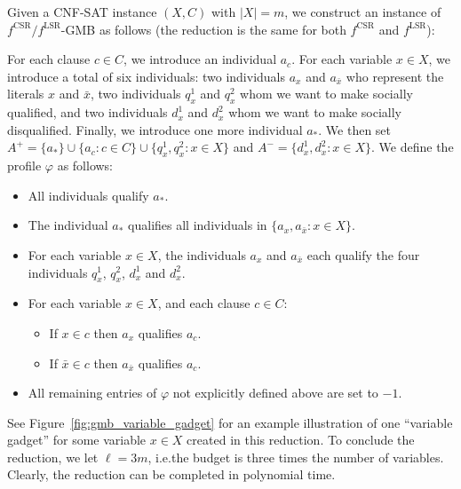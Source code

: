 \documentclass[
    12pt,               %
    a4paper,            %
    bibtotoc,           %
    pointlessnumbers,   %
    ngerman,            %
    titlepage,          %
    leqno,              %
    ]{scrarticle}       %
\newcommand\figref{Figure~\ref}
\begin{document}
\begin{Proof}
Given a CNF-SAT instance $(X, C)$ with $|X|=m$, we construct an instance of $f^{\text{CSR}} / f^{\text{LSR}}$-GMB as follows (the reduction is the same for both $f^{\text{CSR}}$ and $f^{\text{LSR}}$):

For each clause $c \in C$, we introduce an individual $a_c$. For each variable $x \in X$, we introduce a total of six individuals: two individuals $a_x$ and $a_{\bar{x}}$ who represent the literals $x$ and $\bar{x}$, two individuals $q_x^1$ and $q_x^2$ whom we want to make socially qualified, and two individuals $d_x^1$ and $d_x^2$ whom we want to make socially disqualified. Finally, we introduce one more individual $a_\ast$. We then set $A^+ = \{a_\ast\} \cup \{ a_c : c \in C \} \cup \{ q_x^1, q_x^2 : x \in X \}$ and $A^- = \{ d_x^1, d_x^2 : x \in X \}$. We define the profile $\varphi$ as follows:

\begin{itemize}[nolistsep]
\item
All individuals qualify $a_\ast$.
\item
The individual $a_\ast$ qualifies all individuals in $\{ a_x, a_{\bar{x}} : x \in X \}$.
\item
For each variable $x \in X$, the individuals $a_x$ and $a_{\bar{x}}$ each qualify the four individuals $q_x^1$, $q_x^2$, $d_x^1$ and $d_x^2$.
\item
For each variable $x \in X$, and each clause $c \in C$:
    \begin{itemize}[nolistsep]
    \item
    If $x \in c$ then $a_x$ qualifies $a_c$.
    \item
    If $\bar{x} \in c$ then $a_{\bar{x}}$ qualifies $a_c$.
    \end{itemize}
\item
All remaining entries of $\varphi$ not explicitly defined above are set to $-1$.
\end{itemize}

See \figref{fig:gmb_variable_gadget} for an example illustration of one ``variable gadget'' for some variable $x \in X$ created in this reduction. To conclude the reduction, we let $\ell = 3m$, i.e.\@ the budget is three times the number of variables. Clearly, the reduction can be completed in polynomial time.



\begin{figure}[!tbh]
\centering
\raisebox{0.04\height}{
\begin{tikzpicture}[
    > = Stealth,
    shorten > = 1pt,
    auto,
    node distance = 1.8cm,
    main node/.style = {circle,draw,minimum size = 1cm}
]


\end{tikzpicture}}
\end{figure}
\end{Proof}
\end{document}
